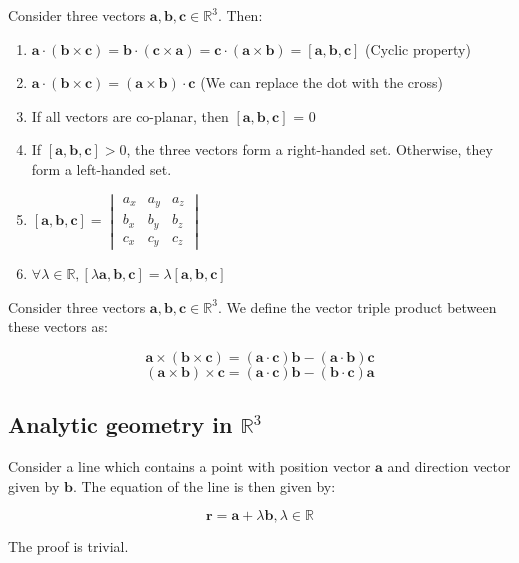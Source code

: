 \documentclass[12pt]{article}
\begin{document}
\begin{proposition}
    Consider three vectors $\mathbf{a, b, c} \in \mathbb{R}^3$. Then:

    \begin{enumerate}
        \item $\mathbf{a \cdot (b \times c)} = \mathbf{b \cdot (c \times a)} = \mathbf{c \cdot (a \times b)} = [\mathbf{a, b, c}]$ (Cyclic property)
        \item $\mathbf{a \cdot (b \times c)} = \mathbf{(a \times b) \cdot c}$ (We can replace the dot with the cross)
        \item If all vectors are co-planar, then $\mathbf{[a, b, c]}$ = 0
        \item If $\mathbf{[a, b, c]} > 0$, the three vectors form a right-handed set. Otherwise, they form a left-handed set.
        \item $\mathbf{[a, b, c]} = \begin{vmatrix}
            a_x & a_y & a_z \\
            b_x & b_y & b_z \\
            c_x & c_y & c_z
        \end{vmatrix}$
        \item $\forall \lambda \in \mathbb{R}, [\lambda\mathbf{a, b, c}] = \lambda[\mathbf{a, b, c}]$
    \end{enumerate}
\end{proposition}

\begin{definition}
    Consider three vectors $\mathbf{a, b, c} \in \mathbb{R}^3$. We define the vector triple product between these vectors as:

    \[ \mathbf{a \times (b \times c)} = (\mathbf{a \cdot c})\mathbf{b} - (\mathbf{a \cdot b})\mathbf{c} \]
    \[ (\mathbf{a \times b}) \times \mathbf{c} = (\mathbf{a \cdot c})\mathbf{b} - (\mathbf{b \cdot c})\mathbf{a} \]
\end{definition}

\newpage

\subsection{Analytic geometry in $\mathbb{R}^3$}

\begin{proposition}
    Consider a line which contains a point with position vector $\mathbf{a}$ and direction vector given by $\mathbf{b}$. The equation of the line is then given by:

    \[ \mathbf{r} = \mathbf{a} + \lambda\mathbf{b}, \lambda \in \mathbb{R} \]

    The proof is trivial.
\end{proposition}
\end{document}
